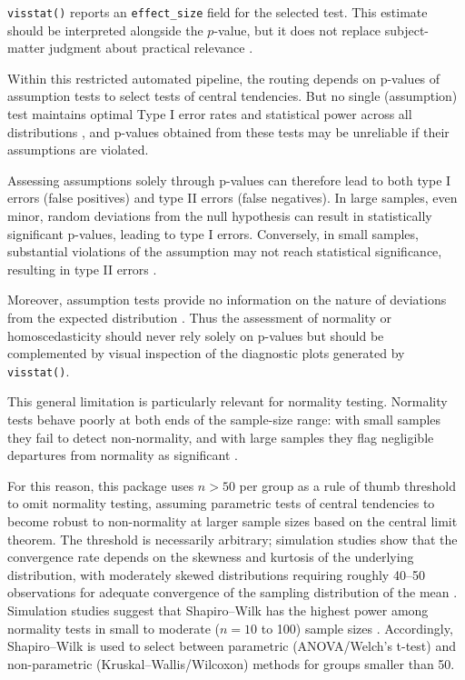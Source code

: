 \texttt{visstat()} reports an \texttt{effect\_size} field for the selected test. This
estimate should be interpreted alongside the \(p\)-value, but it does
not replace subject-matter judgment about practical relevance
\citep{Shatz:2024}.

Within this restricted automated pipeline, the routing depends on
p-values of assumption tests to select tests of central tendencies. But no single (assumption) test maintains optimal Type I
error rates and statistical power across all distributions
\citep{Olejnik:1987}, and p-values obtained from these tests may be
unreliable if their assumptions are violated.

Assessing assumptions solely through p-values can therefore lead to both type I
errors (false positives) and type II errors (false negatives). In large
samples, even minor, random deviations from the null hypothesis can
result in statistically significant p-values, leading to type I errors.
Conversely, in small samples, substantial violations of the assumption
may not reach statistical significance, resulting in type II errors
\citep{Kozak:2018}.

Moreover, assumption tests provide no information on the nature of
deviations from the expected distribution \citep{Shatz:2024}. Thus the
assessment of normality or homoscedasticity should never rely solely on
p-values but should be complemented by visual inspection of the
diagnostic plots generated by \texttt{visstat()}.

This general limitation is particularly relevant for normality testing.
Normality tests behave poorly at both ends of the
sample-size range: with small samples they fail to detect non-normality,
and with large samples they flag negligible departures from normality as
significant \citep{Ghasemi:2012, Fagerland:2012, Franc:2025}.

For this reason, this package uses \(n > 50\) per group as a rule of thumb
threshold to omit normality testing, assuming parametric tests of
central tendencies to become robust to non-normality at larger sample
sizes based on the central limit theorem. The threshold is necessarily
arbitrary; simulation studies show that the convergence rate depends on
the skewness and kurtosis of the underlying distribution, with
moderately skewed distributions requiring roughly 40--50 observations
for adequate convergence of the sampling distribution of the mean
\citep{Fagerland:2012}. Simulation studies suggest that Shapiro--Wilk has the
highest power among normality tests in small to moderate (\(n = 10\) to
100) sample sizes \citep{Razali:2011}. Accordingly, Shapiro--Wilk is used to
select between parametric (ANOVA/Welch's t-test) and non-parametric
(Kruskal--Wallis/Wilcoxon) methods for groups smaller than 50.

